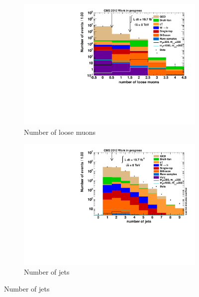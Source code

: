 \begin{figure}[b!]
  \centering
  \begin{subfigure}[b]{0.495\textwidth}
    \centering
    \includegraphics[width=\textwidth]{plots/nTL_nloose.pdf}
    \caption{Number of loose muons\label{fig:ntlnloose}}
  \end{subfigure}
  \begin{subfigure}[b]{0.495\textwidth}
    \centering
    \includegraphics[width=\textwidth]{plots/nTL_njets.pdf}
    \caption{Number of jets\label{fig:ntlnjets}}
  \end{subfigure}
\end{figure}

